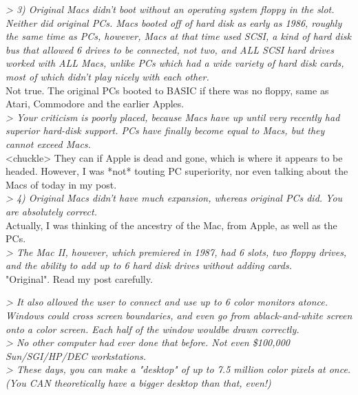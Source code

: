 \documentclass[11pt,twoside,a4paper]{article}
\begin{document}
\begin{multicols*}{2}
\emph{> 3) Original Macs didn't boot without an operating system floppy in the slot. Neither did original PCs. Macs booted off of hard disk as early as 1986, roughly the same time as PCs, however, Macs at that time used SCSI, a kind of hard disk bus that allowed 6 drives to be connected, not two, and ALL SCSI hard drives worked with ALL Macs, unlike PCs which had a wide variety of hard disk cards, most of which didn't play nicely with each other.} ~\\

Not true.  The original PCs booted to BASIC if there was no floppy, same as Atari, Commodore and the earlier Apples. ~\\

\emph{> Your criticism is poorly placed, because Macs have up until very recently had superior hard-disk support. PCs have finally become equal to Macs, but they cannot exceed Macs.} ~\\

<chuckle>  They can if Apple is dead and gone, which is where it appears to be headed.  However, I was *not* touting PC superiority, nor even talking about the Macs of today in my post. ~\\

\emph{> 4) Original Macs didn't have much expansion, whereas original PCs did. You are absolutely correct.}~\\

Actually, I was thinking of the ancestry of the Mac, from Apple, as well as the PCs.~\\

\emph{> The Mac II, however, which premiered in 1987, had 6 slots, two floppy drives, and the ability to add up to 6 hard disk drives without adding cards.}~\\

"Original".  Read my post carefully.

\emph{> It also allowed the user to connect and use up to 6 color monitors atonce. Windows could cross screen boundaries, and even go from ablack-and-white screen onto a color screen. Each half of the window wouldbe drawn correctly.}~\\

\emph{> No other computer had ever done that before. Not even \$100,000 Sun/SGI/HP/DEC workstations.}~\\

\emph{> These days, you can make a "desktop" of up to 7.5 million color pixels at once. (You CAN theoretically have a bigger desktop than that, even!)}~\\


\end{multicols*}
\end{document}

